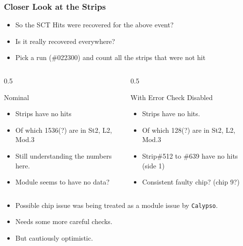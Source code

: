 \begin{frame}
    \frametitle{Closer Look at the Strips}

    \begin{itemize}
        \item So the SCT Hits were recovered for the above event?
        \item Is it really recovered everywhere?
        \item Pick a run (\#{022300}) and count all the strips that were not hit
    \end{itemize}

    \begin{columns}
        \begin{column}{0.5\textwidth}
            \begin{block}{Nominal}
                \begin{itemize}
                    \item {} Strips have no hits
                    \item Of which 1536(?) are in St2, L2, Mod.3
                    \item Still understanding the numbers here.
                    \item Module seems to have no data?
                \end{itemize}
            \end{block}
        \end{column}
        \begin{column}{0.5\textwidth}
            \begin{block}{With Error Check Disabled}
                \begin{itemize}
                    \item {} Strips have no hits.
                    \item Of which 128(?) are in St2, L2, Mod.3
                    \item Strip\#512 to \#639 have no hits (side 1)
                    \item Consistent faulty chip? (chip 9?)
                \end{itemize}
            \end{block}
        \end{column}
    \end{columns}

    \begin{itemize}
        \item Possible chip issue was being treated as a module issue by \texttt{Calypso}.
        \item Needs some more careful checks.
        \item But cautiously optimistic.
    \end{itemize}
\end{frame}


